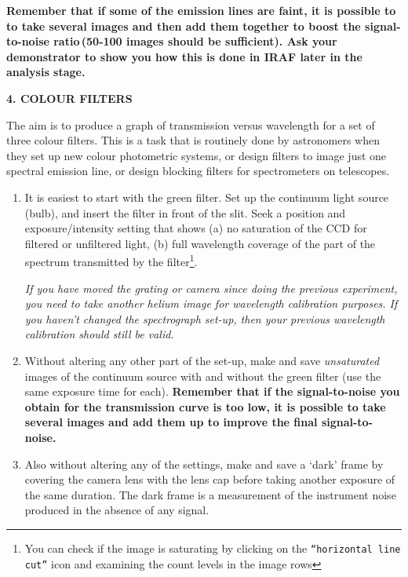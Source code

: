 \documentclass[12pt]{article}
\begin{document}
{\bf Remember that if some of the emission lines are faint, it is possible to to take several images and then add them together to boost the signal-to-noise ratio\,(50-100 images should be sufficient). Ask your demonstrator to show you how this is done in IRAF later in the analysis stage.}

\vspace{1cm}
{\bf 4. COLOUR FILTERS}

The aim is to produce a graph of transmission versus wavelength for a set of three colour filters. This is a task that is routinely done by astronomers when they set up new colour photometric systems, or design filters to image just one spectral emission line, or design blocking filters for spectrometers on telescopes.

\begin{enumerate}

\item It is easiest to start with the green filter. Set up the continuum light source (bulb), and insert the filter in front of the slit. Seek a position and exposure/intensity setting that shows (a) no saturation of the CCD for filtered or unfiltered light, (b) full wavelength coverage of the part of the spectrum transmitted by the filter\footnote{You can check if the image is saturating by clicking on the {\tt ``horizontal line cut''} icon and examining the count levels in the image rows}.

{\it If you have moved the grating or camera since doing the previous experiment, you need to take another helium image for wavelength calibration purposes. If you haven't changed the spectrograph set-up, then your previous wavelength calibration should still be valid.}

\item Without altering any other part of the set-up, make and save {\sl unsaturated} images of the continuum source with and without the green filter (use the same exposure time for each). {\bf Remember that if the signal-to-noise you obtain for the transmission curve is too low, it is possible to take several images and add them up to improve the final signal-to-noise.}

\item Also without altering any of the settings, make and save a `dark' frame by covering the camera lens with the lens cap before taking another exposure of the same duration. The dark frame is a measurement of the instrument noise produced in the absence of any signal.

\end{enumerate}
\end{document}
